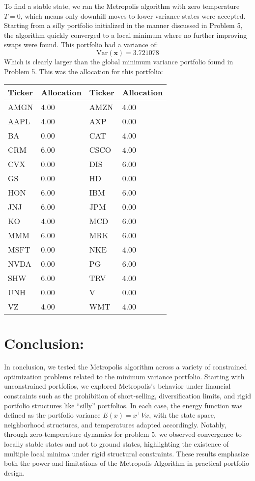 \documentclass{report}
\begin{document}
To find a stable state, we ran the Metropolis algorithm with zero temperature $T = 0$, which means only downhill moves to lower variance states were accepted. Starting from a silly portfolio initialized in the manner discussed in Problem 5, the algorithm quickly converged to a local minimum where no further improving swaps were found. This portfolio had a variance of:
\[
\text{Var}(\mathbf{x}) = 3.721078
\]
Which is clearly larger than the global minimum variance portfolio found in Problem 5. This was the allocation for this portfolio:

\begin{center}
\begin{tabular}{ll|ll} 
\toprule 
\textbf{Ticker} & \textbf{Allocation} & \textbf{Ticker} & \textbf{Allocation} \\
\midrule 
AMGN & 4.00 & AMZN & 4.00 \\
AAPL & 4.00 & AXP  & 0.00 \\
BA   & 0.00 & CAT  & 4.00 \\
CRM  & 6.00 & CSCO & 4.00 \\
CVX  & 0.00 & DIS  & 6.00 \\
GS   & 0.00 & HD   & 0.00 \\
HON  & 6.00 & IBM  & 6.00 \\
JNJ  & 6.00 & JPM  & 0.00 \\
KO   & 4.00 & MCD  & 6.00 \\
MMM  & 6.00 & MRK  & 6.00 \\
MSFT & 0.00 & NKE  & 4.00 \\
NVDA & 0.00 & PG   & 6.00 \\
SHW  & 6.00 & TRV  & 4.00 \\
UNH  & 0.00 & V    & 0.00 \\
VZ   & 4.00 & WMT  & 4.00 \\
\bottomrule
\end{tabular}
\end{center}




\pagebreak

\section*{Conclusion:}
In conclusion, we tested the Metropolis algorithm across a variety of constrained optimization problems related to the minimum variance portfolio. Starting with unconstrained portfolios, we explored Metropolis's behavior under financial constraints such as the prohibition of short-selling, diversification limits, and rigid portfolio structures like “silly” portfolios. In each case, the energy function was defined as the portfolio variance \( E(x) = x^\top V x \), with the state space, neighborhood structures, and temperatures adapted accordingly.  Notably, through zero-temperature dynamics for problem 5, we observed convergence to locally stable states and not to ground states, highlighting the existence of multiple local minima under rigid structural constraints. These results emphasize both the power and limitations of the Metropolis Algorithm in practical portfolio design.
\end{document}
